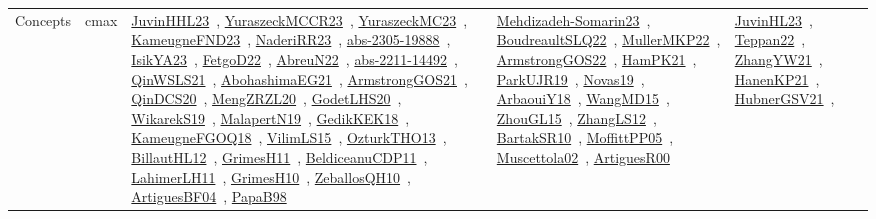 {\begin{longtable}{lp{3cm}>{\raggedright\arraybackslash}p{6cm}>{\raggedright\arraybackslash}p{6cm}>{\raggedright\arraybackslash}p{8cm}}
Concepts & cmax & \href{papers/JuvinHHL23.pdf}{JuvinHHL23}~\cite{JuvinHHL23}, \href{articles/YuraszeckMCCR23.pdf}{YuraszeckMCCR23}~\cite{YuraszeckMCCR23}, \href{papers/YuraszeckMC23.pdf}{YuraszeckMC23}~\cite{YuraszeckMC23}, \href{papers/KameugneFND23.pdf}{KameugneFND23}~\cite{KameugneFND23}, \href{articles/NaderiRR23.pdf}{NaderiRR23}~\cite{NaderiRR23}, \href{articles/abs-2305-19888.pdf}{abs-2305-19888}~\cite{abs-2305-19888}, \href{articles/IsikYA23.pdf}{IsikYA23}~\cite{IsikYA23}, \href{articles/FetgoD22.pdf}{FetgoD22}~\cite{FetgoD22}, \href{articles/AbreuN22.pdf}{AbreuN22}~\cite{AbreuN22}, \href{articles/abs-2211-14492.pdf}{abs-2211-14492}~\cite{abs-2211-14492}, \href{articles/QinWSLS21.pdf}{QinWSLS21}~\cite{QinWSLS21}, \href{articles/AbohashimaEG21.pdf}{AbohashimaEG21}~\cite{AbohashimaEG21}, \href{papers/ArmstrongGOS21.pdf}{ArmstrongGOS21}~\cite{ArmstrongGOS21}, \href{articles/QinDCS20.pdf}{QinDCS20}~\cite{QinDCS20}, \href{articles/MengZRZL20.pdf}{MengZRZL20}~\cite{MengZRZL20}, \href{papers/GodetLHS20.pdf}{GodetLHS20}~\cite{GodetLHS20}, \href{articles/WikarekS19.pdf}{WikarekS19}~\cite{WikarekS19}, \href{papers/MalapertN19.pdf}{MalapertN19}~\cite{MalapertN19}, \href{articles/GedikKEK18.pdf}{GedikKEK18}~\cite{GedikKEK18}, \href{papers/KameugneFGOQ18.pdf}{KameugneFGOQ18}~\cite{KameugneFGOQ18}, \href{papers/VilimLS15.pdf}{VilimLS15}~\cite{VilimLS15}, \href{articles/OzturkTHO13.pdf}{OzturkTHO13}~\cite{OzturkTHO13}, \href{papers/BillautHL12.pdf}{BillautHL12}~\cite{BillautHL12}, \href{papers/GrimesH11.pdf}{GrimesH11}~\cite{GrimesH11}, \href{articles/BeldiceanuCDP11.pdf}{BeldiceanuCDP11}~\cite{BeldiceanuCDP11}, \href{papers/LahimerLH11.pdf}{LahimerLH11}~\cite{LahimerLH11}, \href{papers/GrimesH10.pdf}{GrimesH10}~\cite{GrimesH10}, \href{articles/ZeballosQH10.pdf}{ZeballosQH10}~\cite{ZeballosQH10}, \href{papers/ArtiguesBF04.pdf}{ArtiguesBF04}~\cite{ArtiguesBF04}, \href{articles/PapaB98.pdf}{PapaB98}~\cite{PapaB98} & \href{papers/Mehdizadeh-Somarin23.pdf}{Mehdizadeh-Somarin23}~\cite{Mehdizadeh-Somarin23}, \href{papers/BoudreaultSLQ22.pdf}{BoudreaultSLQ22}~\cite{BoudreaultSLQ22}, \href{articles/MullerMKP22.pdf}{MullerMKP22}~\cite{MullerMKP22}, \href{papers/ArmstrongGOS22.pdf}{ArmstrongGOS22}~\cite{ArmstrongGOS22}, \href{articles/HamPK21.pdf}{HamPK21}~\cite{HamPK21}, \href{papers/ParkUJR19.pdf}{ParkUJR19}~\cite{ParkUJR19}, \href{articles/Novas19.pdf}{Novas19}~\cite{Novas19}, \href{papers/ArbaouiY18.pdf}{ArbaouiY18}~\cite{ArbaouiY18}, \href{articles/WangMD15.pdf}{WangMD15}~\cite{WangMD15}, \href{papers/ZhouGL15.pdf}{ZhouGL15}~\cite{ZhouGL15}, \href{papers/ZhangLS12.pdf}{ZhangLS12}~\cite{ZhangLS12}, \href{articles/BartakSR10.pdf}{BartakSR10}~\cite{BartakSR10}, \href{papers/MoffittPP05.pdf}{MoffittPP05}~\cite{MoffittPP05}, \href{papers/Muscettola02.pdf}{Muscettola02}~\cite{Muscettola02}, \href{articles/ArtiguesR00.pdf}{ArtiguesR00}~\cite{ArtiguesR00} & \href{papers/JuvinHL23.pdf}{JuvinHL23}~\cite{JuvinHL23}, \href{papers/Teppan22.pdf}{Teppan22}~\cite{Teppan22}, \href{articles/ZhangYW21.pdf}{ZhangYW21}~\cite{ZhangYW21}, \href{papers/HanenKP21.pdf}{HanenKP21}~\cite{HanenKP21}, \href{articles/HubnerGSV21.pdf}{HubnerGSV21}~\cite{HubnerGSV21}, 
\end{longtable}}
